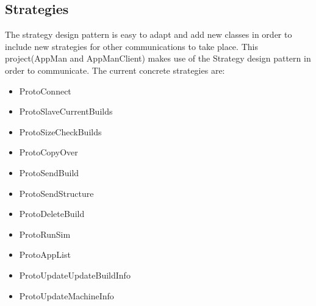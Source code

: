 \documentclass[a4paper,12pt,final]{article}
\begin{document}
\subsection{Strategies}
The strategy design pattern is easy to adapt and add new classes in order to include
new strategies for other communications to take place. This project(AppMan and AppManClient) 
makes use of the Strategy design pattern in order to communicate.
The current concrete strategies are:
\begin{itemize}
\item ProtoConnect
\item ProtoSlaveCurrentBuilds
\item ProtoSizeCheckBuilds
\item ProtoCopyOver
\item ProtoSendBuild
\item ProtoSendStructure
\item ProtoDeleteBuild
\item ProtoRunSim
\item ProtoAppList
\item ProtoUpdateUpdateBuildInfo
\item ProtoUpdateMachineInfo
\end{itemize}
\end{document}
